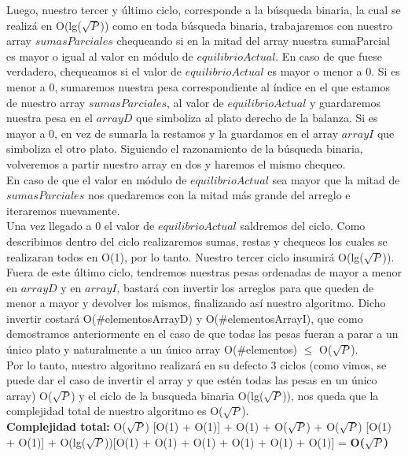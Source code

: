 Luego, nuestro tercer y \'ultimo ciclo, corresponde a la b\'usqueda binaria, la cual se realiz\'a en O(lg($\sqrt{P}$)) como en toda b\'usqueda binaria, trabajaremos con nuestro array $sumasParciales$ chequeando si en la mitad del array nuestra sumaParcial es mayor o igual al valor en m\'odulo de $equilibrioActual$. En caso de que fuese verdadero, chequeamos si el valor de $equilibrioActual$ es mayor o menor a 0. Si es menor a 0, sumaremos nuestra pesa correspondiente al \'indice en el que estamos de nuestro array $sumasParciales$, al valor de $equilibrioActual$ y guardaremos nuestra pesa en el $arrayD$ que simboliza al plato derecho de la balanza. Si es mayor a 0, en vez de sumarla la restamos y la guardamos en el array $arrayI$ que simboliza el otro plato. Siguiendo el razonamiento de la b\'usqueda binaria, volveremos a partir nuestro array en dos y haremos el mismo chequeo.\\
En caso de que el valor en m\'odulo de $equilibrioActual$ sea mayor que la mitad de $sumasParciales$ nos quedaremos con la mitad m\'as grande del arreglo e iteraremos nuevamente.\\
Una vez llegado a 0 el valor de $equilibrioActual$ saldremos del ciclo. Como describimos dentro del ciclo realizaremos sumas, restas y chequeos los cuales se realizaran todos en O(1), por lo tanto. Nuestro tercer ciclo insumir\'a O(lg($\sqrt{P}$)).\\

Fuera de este \'ultimo ciclo, tendremos nuestras pesas ordenadas de mayor a menor en $arrayD$ y en $arrayI$, bastar\'a con invertir los arreglos para que queden de menor a mayor y devolver los mismos, finalizando as\'i nuestro algoritmo. Dicho invertir costar\'a O($\#$elementosArrayD) y O($\#$elementosArrayI), que como demostramos anteriormente en el caso de que todas las pesas fueran a parar a un \'unico plato y naturalmente a un \'unico array O($\#$elementos) $\leq$ O($\sqrt{P}$).\\

Por lo tanto, nuestro algoritmo realizar\'a en su defecto 3 ciclos (como vimos, se puede dar el caso de invertir el array y que est\'en todas las pesas en un \'unico array) O($\sqrt{P}$) y el ciclo de la busqueda binaria O(lg($\sqrt{P}$)), nos queda que la complejidad total de nuestro algoritmo es O($\sqrt{P}$).\\

\textbf{Complejidad total:} O($\sqrt{P}$) [O(1) + O(1)] + O(1) + O($\sqrt{P}$) + O($\sqrt{P}$) [O(1) + O(1)] + O(lg($\sqrt{P}$))[O(1) + O(1) + O(1) + O(1) + O(1) + O(1)] = \textbf{O($\sqrt{P}$)}